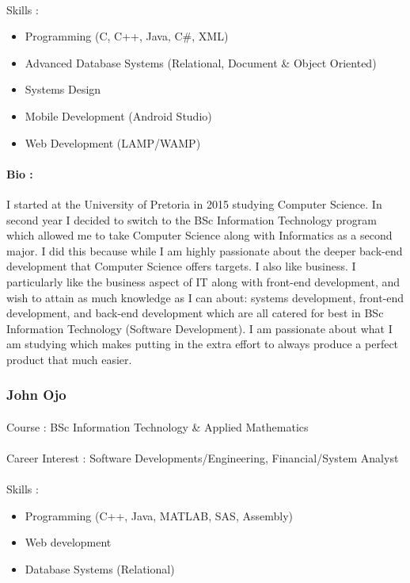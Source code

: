 \documentclass[11pt]{article}
\begin{document}
\paragraph{}Skills : 
\begin{itemize}
\item Programming (C, C++, Java, C\#, XML)
\item Advanced Database Systems (Relational, Document \& Object Oriented)
\item Systems Design
\item Mobile Development (Android Studio)
\item Web Development (LAMP/WAMP)
\end{itemize}
\paragraph{Bio :}I started at the University of Pretoria in 2015 studying Computer Science. In second year I decided to switch to the BSc Information Technology program which allowed me to take Computer Science along with Informatics as a second major. I did this because while I am highly passionate about the deeper back-end development that Computer Science offers targets. I also like business. I particularly like the business aspect of IT along with front-end development, and wish to attain as much knowledge as I can about: systems development, front-end development, and back-end development which are all catered for best in BSc Information Technology (Software Development). I am passionate about what I am studying which makes putting in the extra effort to always produce a perfect product that much easier. 

\subsubsection{John Ojo}
\paragraph{}Course : BSc Information Technology \& Applied Mathematics
\paragraph{}Career Interest : Software Developments/Engineering, Financial/System Analyst
\paragraph{}Skills : 
\begin{itemize}
\item Programming (C++, Java, MATLAB, SAS, Assembly)
\item Web development
\item Database Systems (Relational)
\end{itemize}
\end{document}

